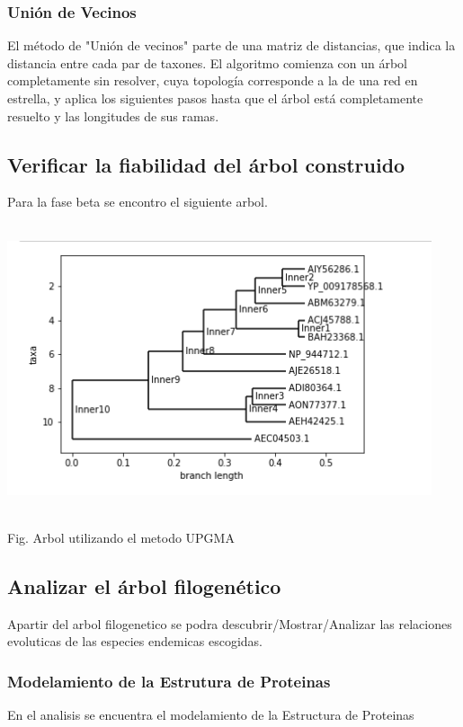 \documentclass[a4paper]{article}
\begin{document}
\subsubsection{Unión de Vecinos}
El método de "Unión de vecinos" parte de una matriz de distancias, que indica la distancia entre cada par de taxones. El algoritmo comienza con un árbol completamente sin resolver, cuya topología corresponde a la de una red en estrella, y aplica los siguientes pasos hasta que el árbol está completamente resuelto y las longitudes de sus ramas.


\subsection{Verificar la fiabilidad del árbol construido}
Para la fase beta se encontro el siguiente arbol.

\begin{center}
	\includegraphics[width=12.5cm,height=8.5cm]{arbol.png}
	
	Fig. Arbol utilizando el metodo UPGMA
\end{center}

\subsection{Analizar el árbol filogenético}
Apartir del arbol filogenetico se podra descubrir/Mostrar/Analizar las relaciones evoluticas de las especies endemicas escogidas.
\subsubsection{Modelamiento de la Estrutura de Proteinas}
En el analisis se encuentra el modelamiento de la Estructura de Proteinas
\end{document}
